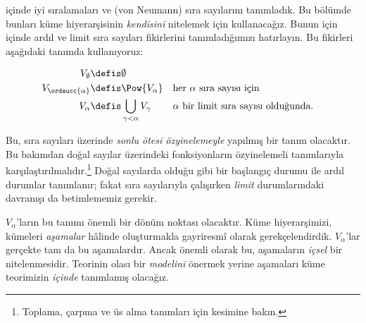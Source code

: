 \documentclass[../../../include/open-logic-section]{subfiles}
\begin{document}


 içinde iyi sıralamaları ve (von Neumann)
sıra sayılarını tanımladık. Bu bölümde bunları küme hiyerarşisinin
\emph{kendisini} nitelemek için kullanacağız. Bunun için
 içinde ardıl ve limit sıra sayıları
fikirlerini tanımladığımızı hatırlayın. Bu fikirleri aşağıdaki tanımda
kullanıyoruz:

\begin{defn}
	\begin{align*}
	V_\emptyset &\defis \emptyset\\
	V_{\ordsucc{\alpha}} &\defis \Pow{V_\alpha} & &
	\text{her $\alpha$ sıra sayısı için}\\
	V_{\alpha} &\defis \bigcup_{\gamma < \alpha} V_\gamma & &
	\text{$\alpha$ bir limit sıra sayısı olduğunda.}
\end{align*}
\end{defn}
\noindent
Bu, sıra sayıları üzerinde \emph{sonlu ötesi özyinelemeyle} yapılmış bir
tanım olacaktır. Bu bakımdan doğal sayılar üzerindeki fonksiyonların
özyinelemeli tanımlarıyla karşılaştırılmalıdır.\footnote{Toplama, çarpma ve
üs alma tanımları için  kesimine
bakın.} Doğal sayılarda olduğu gibi bir başlangıç durumu ile ardıl durumlar
tanımlanır; fakat sıra sayılarıyla çalışırken \emph{limit} durumlarındaki
davranışı da betimlememiz gerekir.

$V_\alpha$'ların bu tanımı önemli bir dönüm noktası olacaktır. Küme
hiyerarşimizi, kümeleri \emph{aşamalar} hâlinde oluşturmakla gayriresmî
olarak gerekçelendirdik. $V_\alpha$'lar gerçekte tam da bu aşamalardır.
Ancak önemli olarak bu, aşamaların \emph{içsel} bir nitelenmesidir. Teorinin
olası bir \emph{modelini} önermek yerine aşamaları küme teorimizin
\emph{içinde} tanımlamış olacağız.
\end{document}
